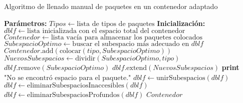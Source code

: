 \begin{algorithm}[H]
    \caption{Algoritmo de llenado manual de paquetes en un contenedor adaptado}
    \label{alg:dblf_adaptado}
    \begin{algorithmic}[1]
        \State \textbf{Parámetros:} $Tipos \gets \text{lista de tipos de paquetes}$
        \State \textbf{Inicialización:} $dblf \gets \text{lista inicializada con el espacio total del contenedor}$
        \State $Contenedor \gets \text{lista vacía para almacenar los paquetes colocados}$
        \State $SubespacioOptimo \gets \text{buscar el subespacio más adecuado en } dblf$
        \State $Contenedor.\text{add}( \text{colocar}(tipo, SubespacioOptimo) )$
        \State $NuevosSubespacios \gets \text{dividir}(SubespacioOptimo, tipo)$
        \State $dblf.\text{remove}(SubespacioOptimo)$
        \State $dblf.\text{extend}(NuevosSubespacios)$
        \Else
        \State \textbf{print} $\text{"No se encontró espacio para el paquete."}$
        \EndIf
        \EndFor
        \State $dblf \gets \text{unirSubespacios}(dblf)$
        \State $dblf \gets \text{eliminarSubespaciosInaccesibles}(dblf)$
        \State $dblf \gets \text{eliminarSubespaciosProfundos}(dblf)$
        \EndFor
        \State \Return $Contenedor$
    \end{algorithmic}
\end{algorithm}

